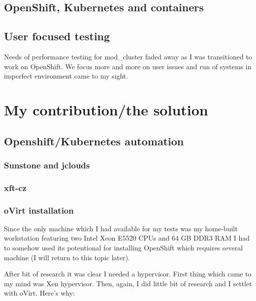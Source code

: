 \documentclass[
  master,
  biblatex,
  glossaries,
  index
]{kidiplom}
\begin{document}
\subsection{OpenShift, Kubernetes and containers}


\subsection{User focused testing}

Needs of performance testing for mod\_cluster faded away as I was transitioned to work on OpenShift. We focus more and more on user issues and run of systems in imperfect environment came to my sight.


\section{My contribution/the solution}

\subsection{Openshift/Kubernetes automation}


\subsubsection{Sunstone and jclouds}

\subsubsection{xft-cz}

\subsubsection{oVirt installation}

Since the only machine which I had available for my tests was my home-built workstation featuring two Intel Xeon E5520 CPUs and 64 GB DDR3 RAM I had to somehow used its potentional for installing OpenShift which requires several machine (I will return to this topic later).

After bit of research it was clear I needed a hypervisor. First thing which came to my mind was Xen hypervisor. Then, again, I did little bit of research and I settlet with oVirt. Here's why: %
\end{document}
